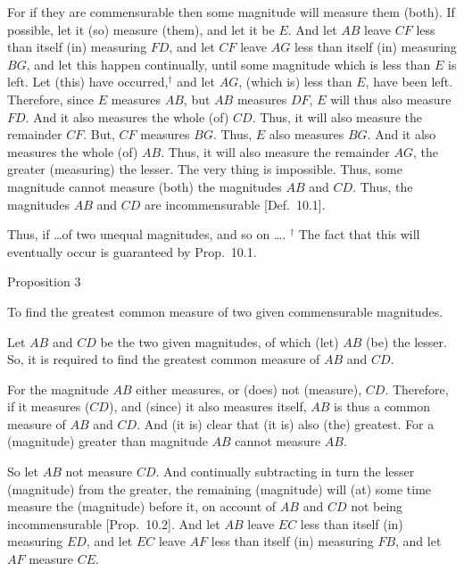 \epsfysize=0.9in
\centerline{}

For if they are commensurable then some magnitude will measure them (both). If possible, let it
(so) measure (them),  and let it be $E$. And let $AB$ leave $CF$
less than itself (in) measuring $FD$, and let $CF$ leave $AG$ less than
itself (in) measuring $BG$, and let this happen continually, until  some magnitude which is less than  $E$ is left. Let (this) have occurred,$^\dag$ and
let $AG$, (which is) less than $E$, have been left. Therefore, since
$E$ measures $AB$, but $AB$ measures $DF$, $E$ will thus also measure $FD$. And it also measures the whole (of) $CD$. Thus, it will
also measure the remainder  $CF$. But, $CF$ measures $BG$. Thus,
$E$ also measures $BG$. And it also measures the whole (of) $AB$. 
Thus, it will also measure the remainder $AG$, the greater (measuring)
the lesser. The very thing is impossible. Thus, some magnitude cannot
measure (both) the magnitudes $AB$ and $CD$. Thus, the
magnitudes $AB$ and $CD$ are incommensurable [Def.~10.1].

Thus, if \ldots of two unequal magnitudes, and so on \ldots.
{\footnotesize\noindent$^\dag$ The fact that this will eventually occur is guaranteed by
Prop.~10.1.}


\begin{center}
{\large Proposition 3}
\end{center}

To find the greatest common measure of two
given commensurable magnitudes.

\epsfysize=1.1in
\centerline{}

Let $AB$ and $CD$ be the two given magnitudes, of which (let) $AB$ (be)
the lesser. So, it is required to find the greatest common measure of
$AB$ and $CD$.

For the magnitude $AB$ either measures, or (does) not (measure), $CD$. Therefore, if
it measures ($CD$), and (since) it also measures itself, $AB$ is thus
a common measure of $AB$ and $CD$. And (it is) clear that (it is) also
(the) greatest. For a (magnitude) greater than magnitude $AB$ cannot
measure $AB$.

So let $AB$ not measure $CD$. And continually subtracting in turn the lesser 
(magnitude) from the greater, the remaining (magnitude) will (at) some time measure the (magnitude)
before it, on account of $AB$ and $CD$ not being incommensurable [Prop.~10.2]. And let $AB$ leave $EC$ less than
itself (in) measuring $ED$, and let $EC$ leave $AF$ less than itself (in)
measuring $FB$, and let $AF$ measure $CE$.

